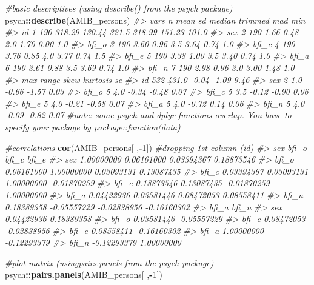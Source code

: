 \documentclass[
]{book}
\newenvironment{Shaded}{\begin{snugshade}}{\end{snugshade}}
\newcommand{\CommentTok}[1]{\textcolor[rgb]{0.56,0.35,0.01}{\textit{#1}}}
\newcommand{\DecValTok}[1]{\textcolor[rgb]{0.00,0.00,0.81}{#1}}
\newcommand{\FunctionTok}[1]{\textcolor[rgb]{0.13,0.29,0.53}{\textbf{#1}}}
\newcommand{\NormalTok}[1]{#1}
\newcommand{\SpecialCharTok}[1]{\textcolor[rgb]{0.81,0.36,0.00}{\textbf{#1}}}
\theoremstyle{definition}
\theoremstyle{definition}
\theoremstyle{definition}
\theoremstyle{definition}
\theoremstyle{remark}
\begin{document}
\begin{Shaded}
\begin{Highlighting}[]
\CommentTok{\#basic descriptives (using describe() from the psych package)}
\NormalTok{psych}\SpecialCharTok{::}\FunctionTok{describe}\NormalTok{(AMIB\_persons)}
\CommentTok{\#\textgreater{}       vars   n   mean     sd median trimmed    mad   min}
\CommentTok{\#\textgreater{} id       1 190 318.29 130.44  321.5  318.99 151.23 101.0}
\CommentTok{\#\textgreater{} sex      2 190   1.66   0.48    2.0    1.70   0.00   1.0}
\CommentTok{\#\textgreater{} bfi\_o    3 190   3.60   0.96    3.5    3.64   0.74   1.0}
\CommentTok{\#\textgreater{} bfi\_c    4 190   3.76   0.85    4.0    3.77   0.74   1.5}
\CommentTok{\#\textgreater{} bfi\_e    5 190   3.38   1.00    3.5    3.40   0.74   1.0}
\CommentTok{\#\textgreater{} bfi\_a    6 190   3.61   0.88    3.5    3.69   0.74   1.0}
\CommentTok{\#\textgreater{} bfi\_n    7 190   2.98   0.96    3.0    3.00   1.48   1.0}
\CommentTok{\#\textgreater{}       max range  skew kurtosis   se}
\CommentTok{\#\textgreater{} id    532 431.0 {-}0.04    {-}1.09 9.46}
\CommentTok{\#\textgreater{} sex     2   1.0 {-}0.66    {-}1.57 0.03}
\CommentTok{\#\textgreater{} bfi\_o   5   4.0 {-}0.34    {-}0.48 0.07}
\CommentTok{\#\textgreater{} bfi\_c   5   3.5 {-}0.12    {-}0.90 0.06}
\CommentTok{\#\textgreater{} bfi\_e   5   4.0 {-}0.21    {-}0.58 0.07}
\CommentTok{\#\textgreater{} bfi\_a   5   4.0 {-}0.72     0.14 0.06}
\CommentTok{\#\textgreater{} bfi\_n   5   4.0 {-}0.09    {-}0.82 0.07}
\CommentTok{\#note: some psych and dplyr functions overlap. You have to specify your package by package::function(data)}

\CommentTok{\#correlations}
\FunctionTok{cor}\NormalTok{(AMIB\_persons[ ,}\SpecialCharTok{{-}}\DecValTok{1}\NormalTok{]) }\CommentTok{\#dropping 1st column (id)}
\CommentTok{\#\textgreater{}              sex       bfi\_o       bfi\_c       bfi\_e}
\CommentTok{\#\textgreater{} sex   1.00000000  0.06161000  0.03394367  0.18873546}
\CommentTok{\#\textgreater{} bfi\_o 0.06161000  1.00000000  0.03093131  0.13087435}
\CommentTok{\#\textgreater{} bfi\_c 0.03394367  0.03093131  1.00000000 {-}0.01870259}
\CommentTok{\#\textgreater{} bfi\_e 0.18873546  0.13087435 {-}0.01870259  1.00000000}
\CommentTok{\#\textgreater{} bfi\_a 0.04422936  0.03581446  0.08472053  0.08558411}
\CommentTok{\#\textgreater{} bfi\_n 0.18389358 {-}0.05557229 {-}0.02838956 {-}0.16160302}
\CommentTok{\#\textgreater{}             bfi\_a       bfi\_n}
\CommentTok{\#\textgreater{} sex    0.04422936  0.18389358}
\CommentTok{\#\textgreater{} bfi\_o  0.03581446 {-}0.05557229}
\CommentTok{\#\textgreater{} bfi\_c  0.08472053 {-}0.02838956}
\CommentTok{\#\textgreater{} bfi\_e  0.08558411 {-}0.16160302}
\CommentTok{\#\textgreater{} bfi\_a  1.00000000 {-}0.12293379}
\CommentTok{\#\textgreater{} bfi\_n {-}0.12293379  1.00000000}

\CommentTok{\#plot matrix (usingpairs.panels from the psych package)}
\NormalTok{psych}\SpecialCharTok{::}\FunctionTok{pairs.panels}\NormalTok{(AMIB\_persons[ ,}\SpecialCharTok{{-}}\DecValTok{1}\NormalTok{])}
\end{Highlighting}
\end{Shaded}
\end{document}
